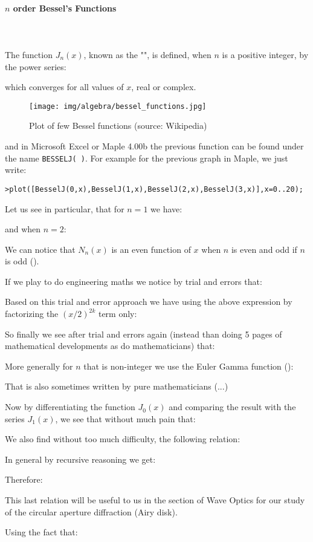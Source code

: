 	\paragraph{$n$ order Bessel's Functions}\mbox{}\\\\
	The function $J_n(x)$, known as the "", is defined, when $n$ is a positive integer, by the power series:
	
	which converges for all values of $x$, real or complex.
	\begin{figure}[H]
		\centering
		\texttt{[image: img/algebra/bessel\_functions.jpg]}
		\caption[Plot of few Bessel functions]{Plot of few Bessel functions (source: Wikipedia)}
	\end{figure}
	and in Microsoft Excel or Maple 4.00b the previous function can be found under the name \texttt{BESSELJ( )}. For example for the previous graph in Maple, we just write:
	
	\texttt{>plot([BesselJ(0,x),BesselJ(1,x),BesselJ(2,x),BesselJ(3,x)],x=0..20);}
	
	Let us see in particular, that for $n=1$ we have:
	
	and when $n=2$:
	
	We can notice that $N_n(x)$ is an even function of $x$ when $n$ is even and odd if $n$ is odd ().
	
	If we play to do engineering maths we notice by trial and errors that:
	
	Based on this trial and error approach we have using the above expression by factorizing the $(x/2)^{2k}$ term only:
	
	So finally we see after trial and errors again (instead than doing 5 pages of mathematical developments as do mathematicians) that:
	
	More generally for $n$ that is non-integer we use the Euler Gamma function ():
	
	That is also sometimes written by pure mathematicians (...)
	
	Now by differentiating the function $J_0(x)$ and comparing the result with the series $J_1(x)$, we see that without much pain that:
	
	We also find without too much difficulty, the following relation:
	 
	\begin{tcolorbox}[title=Remark,colframe=black,arc=10pt]
	In general by recursive reasoning we get:
	
	Therefore:
	
	This last relation will be useful to us in the section of Wave Optics for our study of the circular aperture diffraction (Airy disk).
	\end{tcolorbox}
	Using the fact that:
	

